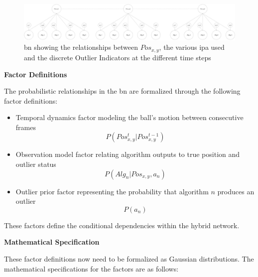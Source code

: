 \documentclass[12pt,a4paper]{article}
\begin{document}
 \begin{figure}[H]
 	\centering
 	\includegraphics[width=1\textwidth]{BNwtime.jpg}
 	\caption{\acl{bn} showing the relationships between $Pos_{x,y}$, the various \acs{ipa} used and the discrete Outlier Indicators at the different time steps}
 	\label{fig:fulltimeBN}
 \end{figure}

 
\textbf{Factor Definitions}

The probabilistic relationships in the \acs{bn} are formalized through the following factor definitions:

\begin{itemize}
	\item Temporal dynamics factor modeling the ball's motion between consecutive frames
	\begin{equation}P(Pos_{x,y}^t | Pos_{x,y}^{t-1})\end{equation}
	\item Observation model factor relating algorithm outputs to true position and outlier status
	\begin{equation}P(Alg_n | Pos_{x,y}, a_n)\end{equation}
	\item Outlier prior factor representing the probability that algorithm $n$ produces an outlier
	\begin{equation}P(a_n)\end{equation} 
\end{itemize}

These factors define the conditional dependencies within the hybrid network.

\textbf{Mathematical Specification}

These factor definitions now need to be formalized as Gaussian distributions. The mathematical specifications for the factors are as follows:
\end{document}
